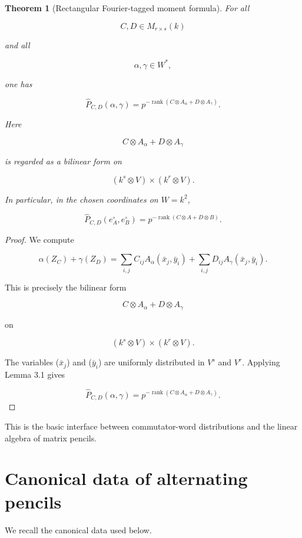 \documentclass[11pt]{article}
\newtheorem{theorem}{Theorem}[section]
\begin{document}
\begin{theorem}[Rectangular Fourier-tagged moment formula]

For all

\[
C,D\in M_{r\times s}(k)
\]

and all

\[
\alpha,\gamma\in W^*,
\]

one has

\[
\boxed{
\widehat P_{C,D}(\alpha,\gamma)
=
p^{-\operatorname{rank}(C\otimes A_\alpha+D\otimes A_\gamma)}.
}
\]

Here

\[
C\otimes A_\alpha+D\otimes A_\gamma
\]

is regarded as a bilinear form on

\[
(k^s\otimes V)\times(k^r\otimes V).
\]

In particular, in the chosen coordinates on $W=k^2$,

\[
\boxed{
\widehat P_{C,D}(e_A^\circ,e_B^\circ)
=
p^{-\operatorname{rank}(C\otimes A+D\otimes B)}.
}
\]

\end{theorem}

\begin{proof}

We compute

\[
\alpha(Z_C)+\gamma(Z_D)
=
\sum_{i,j}
C_{ij}A_\alpha(\bar x_j,\bar y_i)
+
\sum_{i,j}
D_{ij}A_\gamma(\bar x_j,\bar y_i).
\]

This is precisely the bilinear form

\[
C\otimes A_\alpha+D\otimes A_\gamma
\]

on

\[
(k^s\otimes V)\times(k^r\otimes V).
\]

The variables ($\bar x_j$) and ($\bar y_i$) are uniformly distributed in $V^s$ and $V^r$. Applying Lemma 3.1 gives

\[
\widehat P_{C,D}(\alpha,\gamma)
=
p^{-\operatorname{rank}(C\otimes A_\alpha+D\otimes A_\gamma)}.
\]

\end{proof}

This is the basic interface between commutator-word distributions and the linear algebra of matrix pencils.

\section{Canonical data of alternating pencils}

We recall the canonical data used below.
\end{document}
